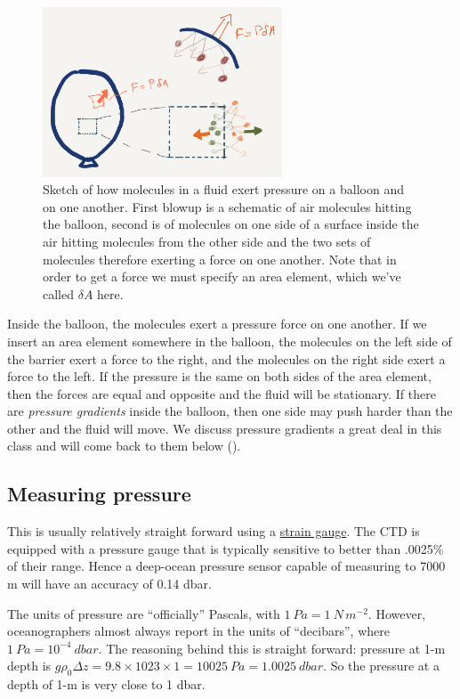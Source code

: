\begin{figure}[h]
    \includegraphics[width=2.8in]{figs/Balloon.png}
    \caption{Sketch of how molecules in a fluid exert pressure on a balloon and on one another. First blowup is a schematic of air molecules hitting the balloon, second is of molecules on one side of a surface inside the air hitting molecules from the other side and the two sets of molecules therefore exerting a force on one another.  Note that in order to get a force we must specify an area element, which we've called $\delta A$ here.  }
    \label{fig:Ballon}
\end{figure}

Inside the balloon, the molecules  exert a pressure force on one another. If we insert an area element somewhere in the balloon, the molecules on the left side of the barrier exert a force to the right, and the molecules on the right side exert a force to the left.  If the pressure is the same on both sides of the area element, then the forces are equal and opposite and the fluid will be stationary.  If there are \emph{pressure gradients} inside the balloon, then one side may push harder than the other and the fluid will move.  We discuss pressure gradients a great deal in this class and will come back to them below ().  

\subsection{Measuring pressure}

This is usually relatively straight forward using a \href{https://en.wikipedia.org/wiki/Strain_gauge}{strain gauge}.  The CTD is equipped with a pressure gauge that is typically sensitive to better than .0025\% of their range.  Hence a deep-ocean pressure sensor capable of measuring to 7000 m will have an accuracy of 0.14 dbar.  

The units of pressure are ``officially'' Pascals, with $1\ Pa = 1\ N\,m^{-2}$.  However, oceanographers almost always  report in the units of ``decibars'', where $1\ Pa = 10^{-4}\ dbar$.  The reasoning behind this is straight forward: pressure at 1-m depth is $g \rho_0 \Delta z = 9.8 \times 1023 \times 1 = 10025\ Pa = 1.0025\ dbar$.  So the pressure at a depth of 1-m is very close to 1 dbar.  



